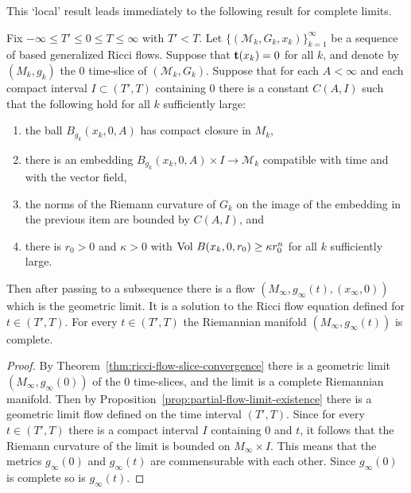 This `local' result leads immediately to the following result for
complete limits.

\begin{theorem}\label{thm:ricci-flow-geometric-limit-existence}

\label{flowlimit}

Fix $-\infty\le T'\le 0\le T\le \infty$ with $T'<T$. Let $\{({\mathcal
M}_k,G_k,x_k)\}_{k=1}^\infty$ be a sequence of based generalized Ricci flows.
Suppose that ${\bf t}(x_k)=0$ for all $k$, and denote by $(M_k,g_k)$ the $0$
time-slice of $({\mathcal M}_k,G_k)$. Suppose that for each $A<\infty$ and each
compact interval $I\subset (T',T)$ containing $0$ there is a constant $C(A,I)$
such that the following hold for all $k$ sufficiently large:
\begin{enumerate}
\item[(1)]  the ball
$B_{g_k}(x_k,0,A)$ has compact closure in $M_k$, \item[(2)]  there is an
embedding $B_{g_k}(x_k,0,A)\times I\to {\mathcal M}_k$ compatible with time and
with the vector field,
\item[(3)] the norms of the Riemann curvature of $G_k$ on the image of the embedding in the
previous item are  bounded by $C(A,I)$, and
\item[(4)] there is $r_0>0$ and $\kappa>0$ with $\operatorname{Vol}\,B(x_k,0,r_0)\ge \kappa r_0^n$
for all $k$ sufficiently large.
\end{enumerate}
 Then after passing to a subsequence there is a
flow  $(M_\infty,g_\infty(t),(x_\infty,0))$ which is the geometric
limit. It is a solution to the Ricci flow equation defined for $t\in
(T',T)$. For every $t\in (T',T)$ the Riemannian manifold
$(M_\infty,g_\infty(t))$ is complete.
\end{theorem}


\begin{proof}
\sketch
{}
By Theorem~\ref{thm:ricci-flow-slice-convergence} there is a geometric limit $(M_\infty,g_\infty(0))$
of the $0$ time-slices, and the limit  is a complete Riemannian manifold. Then
by Proposition~\ref{prop:partial-flow-limit-existence} there is a geometric limit flow defined
on the time interval $(T',T)$. Since for every $t\in (T',T)$ there is a compact
interval $I$ containing $0$ and $t$, it follows that the Riemann curvature of
the limit is bounded on $M_\infty\times I$. This means that the metrics
$g_\infty(0)$ and $g_\infty(t)$ are commensurable with each other. Since
$g_\infty(0)$ is complete so is $g_\infty(t)$.
\end{proof}


